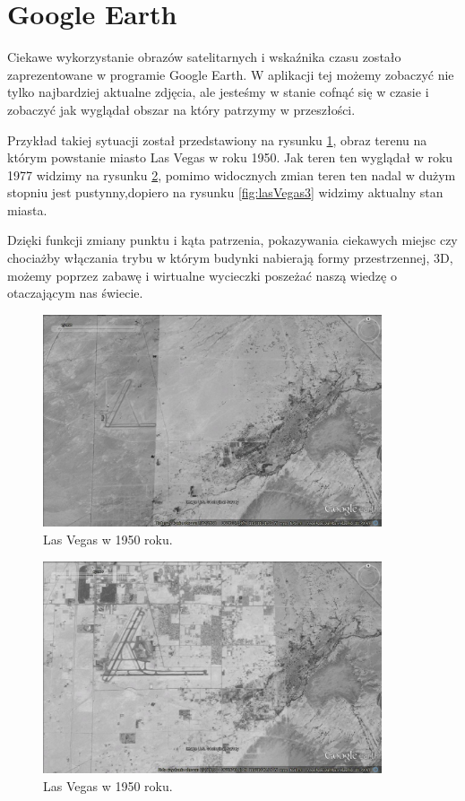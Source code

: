 \section{Google Earth}
\label{sec:Google Earth}

Ciekawe wykorzystanie obrazów satelitarnych i wskaźnika czasu zostało zaprezentowane w programie Google Earth. W aplikacji tej możemy zobaczyć nie tylko najbardziej aktualne zdjęcia, ale jesteśmy w stanie cofnąć się w czasie i zobaczyć jak wyglądał obszar na który patrzymy w przeszłości.

Przykład takiej sytuacji został przedstawiony na rysunku \ref{fig:lasVegas1}, obraz terenu na którym powstanie miasto Las Vegas w roku 1950. Jak teren ten wyglądał w roku 1977 widzimy na rysunku \ref{fig:lasVegas2}, pomimo widocznych zmian teren ten nadal w dużym stopniu jest pustynny,dopiero na rysunku \ref{fig:lasVegas3} widzimy aktualny stan miasta.

Dzięki funkcji zmiany punktu i kąta patrzenia, pokazywania ciekawych miejsc czy chociażby włączania trybu w którym budynki nabierają formy przestrzennej, 3D, możemy poprzez zabawę i wirtualne wycieczki poszeżać naszą wiedzę o otaczającym nas świecie.

\begin{figure}[H]
  \centering
    \includegraphics[width=100mm]{ge/01_1950.jpg}
  \caption{Las Vegas w 1950 roku.}
  \label{fig:lasVegas1}
\end{figure}

\begin{figure}[H]
  \centering
    \includegraphics[width=100mm]{ge/02_1977.jpg}
  \caption{Las Vegas w 1950 roku.}
  \label{fig:lasVegas2}
\end{figure}

